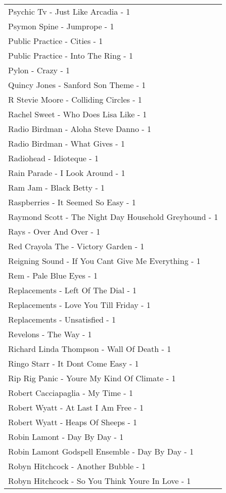 \documentclass[
]{article}
\begin{document}
\begin{longtable}{l}
Psychic Tv - Just Like Arcadia - 1 \\ 
Psymon Spine - Jumprope - 1 \\ 
Public Practice - Cities - 1 \\ 
Public Practice - Into The Ring - 1 \\ 
Pylon - Crazy - 1 \\ 
Quincy Jones - Sanford Son Theme - 1 \\ 
R Stevie Moore - Colliding Circles - 1 \\ 
Rachel Sweet - Who Does Lisa Like - 1 \\ 
Radio Birdman - Aloha Steve Danno - 1 \\ 
Radio Birdman - What Gives - 1 \\ 
Radiohead - Idioteque - 1 \\ 
Rain Parade - I Look Around - 1 \\ 
Ram Jam - Black Betty - 1 \\ 
Raspberries - It Seemed So Easy - 1 \\ 
Raymond Scott - The Night Day Household Greyhound - 1 \\ 
Rays - Over And Over - 1 \\ 
Red Crayola The - Victory Garden - 1 \\ 
Reigning Sound - If You Cant Give Me Everything - 1 \\ 
Rem - Pale Blue Eyes - 1 \\ 
Replacements - Left Of The Dial - 1 \\ 
Replacements - Love You Till Friday - 1 \\ 
Replacements - Unsatisfied - 1 \\ 
Revelons - The Way - 1 \\ 
Richard Linda Thompson - Wall Of Death - 1 \\ 
Ringo Starr - It Dont Come Easy - 1 \\ 
Rip Rig Panic - Youre My Kind Of Climate - 1 \\ 
Robert Cacciapaglia - My Time - 1 \\ 
Robert Wyatt - At Last I Am Free - 1 \\ 
Robert Wyatt - Heaps Of Sheeps - 1 \\ 
Robin Lamont - Day By Day - 1 \\ 
Robin Lamont Godspell Ensemble - Day By Day - 1 \\ 
Robyn Hitchcock - Another Bubble - 1 \\ 
Robyn Hitchcock - So You Think Youre In Love - 1 \\ 

\end{longtable}
\end{document}
